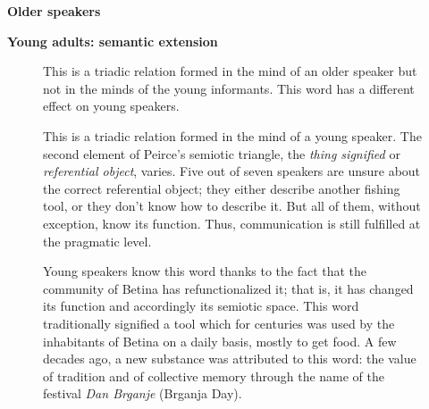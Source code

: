 

	\begin{minipage}[t]{0.29\textwidth}
		\centering
		\textbf{Older speakers}
	\end{minipage}%
	\hspace{.05\textwidth}%
	\begin{minipage}[t]{0.63\textwidth}
		\centering
		\textbf{Young adults: semantic extension}
	\end{minipage}%
	\newline\newline%
	\begin{subfigure}[t]{0.29\textwidth}
		{\centering
		}
		
		 This is a triadic relation formed in the mind of an older speaker but not in the minds of the young informants.
		 This word has a different effect on young speakers.
	\end{subfigure}%
	\hspace{.05\textwidth}%
	\begin{subfigure}[t]{0.29\textwidth}
		{\centering
		}
		
		This is a triadic relation formed in the mind of a young speaker.
		The second element of Peirce's semiotic triangle, the \emph{thing signified} or \emph{referential object}, varies.
		Five out of seven speakers are unsure about the correct referential object; they either describe another fishing tool, or they don't know how to describe it.
		But all of them, without exception, know its function.
		Thus, communication is still fulfilled at the pragmatic level.
	\end{subfigure}%
	\hspace{.05\textwidth}%
	\begin{subfigure}[t]{0.29\textwidth}
		{\centering
		}
		
		Young speakers know this word thanks to the fact that the community of Betina has refunctionalized it; that is, it has changed its function and accordingly its semiotic space.
		This word traditionally signified a tool which for centuries was used by the inhabitants of Betina on a daily basis, mostly to get food.
		A few decades ago, a new substance was attributed to this word: the value of tradition and of collective memory through the name of the festival \emph{Dan Brganje} (Brganja Day).
	\end{subfigure}%

